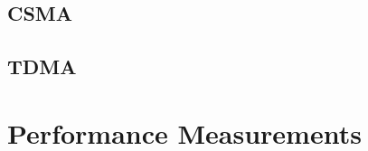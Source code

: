\lipsum

\subsection{CSMA} %
\label{sub:csma}

\lipsum


\subsection{TDMA} %
\label{sub:tdma}

\lipsum




\section{Performance Measurements} %
\label{sec:performance_measurements}

